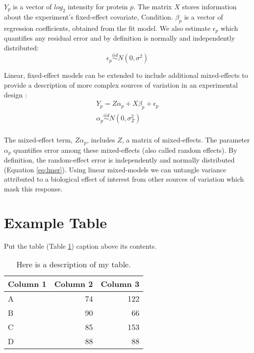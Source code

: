 \documentclass[PhD]{dukethesis}\usepackage[]{graphicx}\usepackage[]{color}
\begin{document}
$Y_{p}$ is a vector of $log_{2}$ intensity for protein $p$. The matrix $X$
stores information about the experiment's fixed-effect covariate,
Condition.  $\beta_{p}$ is a vector of regression coefficients,
obtained from the fit model.  We also estimate $\epsilon_{p}$ which quantifies
any residual error and by definition is normally and independently distributed:
\begin{equation}
    \label{eq:error}
	\epsilon_{p} \stackrel{iid}{\sim} N(0,\sigma^2) %
\end{equation}

Linear, fixed-effect models can be extended to include additional mixed-effects
to provide a description of more complex sources of variation in an experimental
design \cite{Bates2015}:
\begin{equation}
	\begin{gathered}
		\label{eq:lmer}
		Y_{p} =  Z\alpha_{p} + X\beta_{p} + \epsilon_{p} \\
		\alpha_{p} \stackrel{iid}{\sim} N(0,\sigma_{Z}^2) \\
	\end{gathered}
\end{equation}

The mixed-effect term, $Z\alpha_{p}$, includes $Z$, a matrix of mixed-effects.
The parameter $\alpha_{p}$ quantifies error among these mixed-effects (also
called random effects).  By definition, the random-effect error is independently
and normally distributed (Equation \ref{eq:lmer}). Using linear mixed-models we
can untangle variance attributed to a biological effect of interest from other
sources of variation which mask this response.


\section{Example Table}

Put the table (Table \ref{table:example}) caption above its contents.

\begin{table}[ht]
	\caption[This is my table's caption.]{
		Here is a description of my table.}
	\begin{tabular}{lrr}
		\hline
		\textbf{Column 1} & \textbf{Column 2} & \textbf{Column 3} \\
		\hline
		A & 74 & 122\\
		B & 90 & 66\\
		C & 85 & 153\\
		D & 88 & 88\\
		\hline
	\end{tabular}
	\label{table:example}
\end{table}
\end{document}
